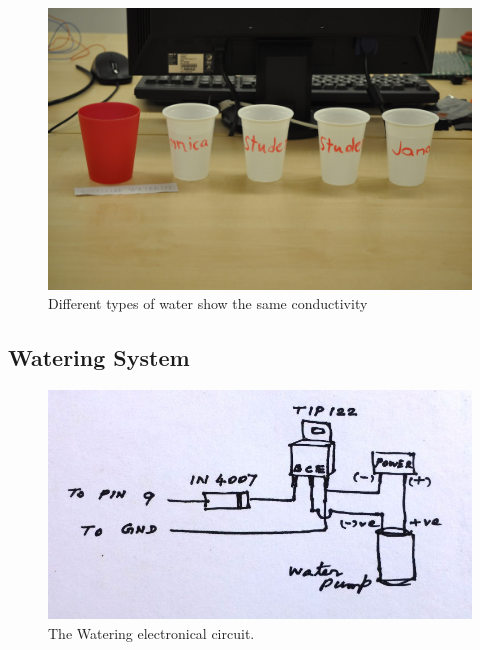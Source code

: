 \documentclass[conference]{IEEEtran}
\begin{document}


\begin{figure}
    \centering
    \includegraphics[width=\columnwidth]{water_testing}
    \caption{Different types of water show the same conductivity}
    \label{fig:water_testing}
\end{figure}

\subsection{Watering System}




\begin{figure}
    \centering
    \includegraphics[width=\columnwidth]{circuit}
    \caption{The Watering electronical circuit.}
    \label{fig:circuit}
\end{figure}
\end{document}
